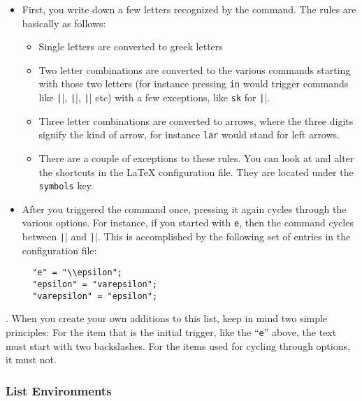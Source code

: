 \documentclass[11pt, x11names]{article}
\begin{document}
\begin{itemize}

  \item First, you write down a few letters recognized by the command. The rules are basically as follows:

  \begin{itemize}

    \item Single letters are converted to greek letters

    \item Two letter combinations are converted to the various commands starting with those two letters (for instance pressing \texttt{in} would trigger commands like \texttt|\int|, \texttt|\inf|, \texttt|\infty| etc) with a few exceptions, like \texttt{sk} for \texttt|\smallskip|.

    \item Three letter combinations are converted to arrows, where the three digits signify the kind of arrow, for instance \texttt{lar} would stand for left arrows.

    \item There are a couple of exceptions to these rules. You can look at and alter the shortcuts in the LaTeX configuration file. They are located under the \texttt{symbols} key.

  \end{itemize}

  \item After you triggered the command once, pressing it again cycles through the various options. For instance, if you started with \texttt{e}, then the command cycles between \texttt|\epsilon| and \texttt|\varepsilon|. This is accomplished by the following set of entries in the configuration file:

  \begin{verbatim}
  "e" = "\\epsilon";
  "epsilon" = "varepsilon";
  "varepsilon" = "epsilon";
  \end{verbatim}
\end{itemize}

. When you create your own additions to this list, keep in mind two simple principles: For the item that is the initial trigger, like the “\texttt{e}” above, the text must start with two backslashes. For the items used for cycling through options, it must not.

\subsubsection{List Environments}
\end{document}
